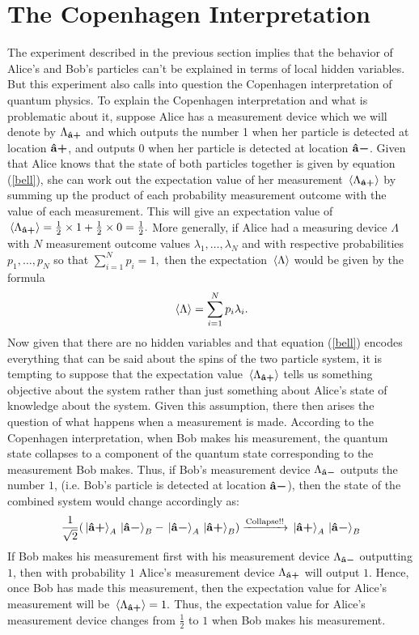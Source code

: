       \section{The Copenhagen Interpretation}
       The experiment described in the previous section implies that the behavior of Alice's and Bob's particles can't be explained in terms of local hidden variables. But this experiment also calls into question the Copenhagen interpretation of quantum physics. To explain the Copenhagen interpretation and what is problematic about it, suppose Alice has a measurement device which we will denote by $\Lambda_{\vb{\hat{{a}}}\bm{+}}$\label{Lambdaa} and which outputs the number 1 when her particle is detected at location $\vb{\hat{{a}}}\bm{+}$, and outputs 0 when her particle is detected at location $\vb{\hat{{a}}}\bm{-}$. Given that Alice knows that the state of both particles together is given by equation (\ref{bell}), she can work out the expectation value of her measurement $\ev*{\Lambda_{\uvbp{a}}}$ by summing up the product of each probability measurement outcome with the value of each measurement. This will give an expectation value of $\ev*{\Lambda_{\uvbp{a}}}=\frac{1}{2}\times 1 + \frac{1}{2}\times 0 = \frac{1}{2}.$ More generally, if Alice had a measuring device $\Lambda$ with $N$ measurement outcome values $\lambda_1,\ldots,\lambda_N$ and with respective probabilities $p_1,\ldots,p_N$ so that $\sum_{i=1}^N p_i=1,$ then the expectation $\ev*{\Lambda}$ would be given by the formula
      \begin{equation}\label{expectation}\ev*{\Lambda} =\sum_{i=1}^N p_i\lambda_i.
      \end{equation}
      Now given that there are no hidden variables and that equation (\ref{bell}) encodes everything that can be said about the spins of the two particle system, it is tempting to suppose that the expectation value $\ev*{\Lambda_{\uvbp{a}}}$ tells us something objective about the system rather than just something about Alice's state of knowledge about the system.  Given this assumption, there then arises the question of what happens when a measurement is made. According to the Copenhagen interpretation, when Bob makes his measurement, the quantum state collapses to a component of the quantum state corresponding to the measurement Bob makes. Thus, if Bob's measurement device $\Lambda_{\vb{\hat{{a}}}\bm{-}}$ outputs the number $1$, (i.e. Bob's particle is detected at location $\vb{\hat{{a}}}\bm{-}$), then the state of the combined system would change accordingly as:
      $$\frac{1}{\sqrt{2}}(\ket*{\vb{\hat{{a}}}\bm{+}}_A\ket*{\vb{\hat{{a}}}\bm{-}}_B-\ket*{\vb{\hat{{a}}}\bm{-}}_A\ket*{\vb{\hat{{a}}}\bm{+}}_B)\xrightarrow{\text{Collapse!!}}\ket*{\vb{\hat{{a}}}\bm{+}}_A\ket*{\vb{\hat{{a}}}\bm{-}}_B $$
      If Bob makes his measurement first with his measurement device $\Lambda_{\vb{\hat{{a}}}\bm{-}}$  outputting $1$, then with probability $1$ Alice's measurement device $\Lambda_{\vb{\hat{{a}}}\bm{+}}$ will output $1$. Hence, once Bob has made this measurement, then the expectation value for Alice's measurement will be $\ev*{\Lambda_{\uvbp{a}}}=1.$ Thus, the expectation value for Alice's measurement device changes from $\frac{1}{2}$ to $1$ when Bob makes his measurement.
       
